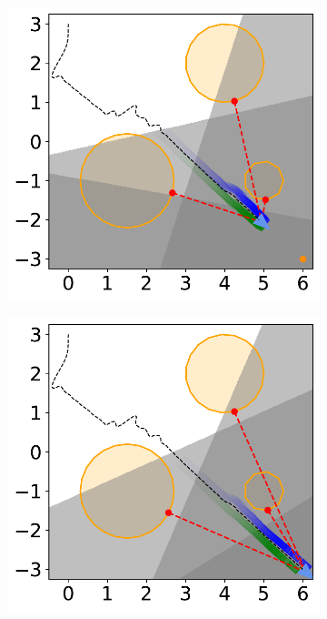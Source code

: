 \begin{figure}[H]
    \begin{subfigure}{0.35\textwidth}
        \centering
        \includegraphics[width=\textwidth]{figures/Simulations/sim1circles_delta/frame_8.pdf}
    \end{subfigure}%
    \hspace{1em}
    \begin{subfigure}{0.35\textwidth}
        \centering
        \includegraphics[width=\textwidth]{figures/Simulations/sim1circles_delta/frame_9.pdf}
    \end{subfigure}
    

\end{figure}
